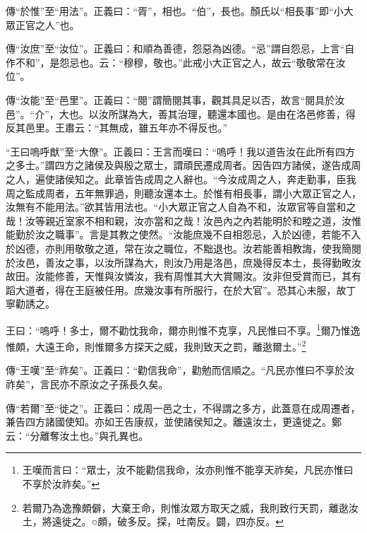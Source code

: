 {\noindent\zhuan{}\fzbyks 傳“於惟”至“用法”。正義曰：“胥”，相也。“伯”，長也。顏氏以“相長事”即“小大眾正官之人”也。 \par}

{\noindent\zhuan{}\fzbyks 傳“汝庶”至“汝位”。正義曰：和順為善德，怨惡為凶德。“忌”謂自怨忌，上言“自作不和”，是怨忌也。云：“穆穆，敬也。”此戒小大正官之人，故云“敬敬常在汝位”。 \par}

{\noindent\zhuan{}\fzbyks 傳“汝能”至“邑里”。正義曰：“閱”謂簡閱其事，觀其具足以否，故言“閱具於汝邑”。“介”，大也。以汝所謀為大，善其治理，聽還本國也。是由在洛邑修善，得反其邑里。王肅云：“其無成，雖五年亦不得反也。” \par}

{\noindent\shu{}\fzkt “王曰嗚呼猷”至“大僚”。正義曰：王言而嘆曰：“嗚呼！我以道告汝在此所有四方之多士。”謂四方之諸侯及與殷之眾士，謂頑民遷成周者。因告四方諸侯，遂告成周之人，遍使諸侯知之。此章皆告成周之人辭也。“今汝成周之人，奔走勤事，臣我周之監成周者，五年無罪過，則聽汝還本土。於惟有相長事，謂小大眾正官之人，汝無有不能用法。”欲其皆用法也。“小大眾正官之人自為不和，汝眾官等自當和之哉！汝等親近室家不相和親，汝亦當和之哉！汝邑內之內若能明於和睦之道，汝惟能勤於汝之職事”。言是其教之使然。“汝能庶幾不自相怨忌，入於凶德，若能不入於凶德，亦則用敬敬之道，常在汝之職位，不黜退也。汝若能善相教誨，使我簡閱於汝邑，善汝之事，以汝所謀為大，則汝乃用是洛邑，庶幾得反本土，長得勤畋汝故田。汝能修善，天惟與汝憐汝，我有周惟其大大賞賜汝。汝非但受賞而已，其有蹈大道者，得在王庭被任用。庶幾汝事有所服行，在於大官”。恐其心未服，故丁寧勸誘之。 \par}

王曰：“嗚呼！多士，爾不勸忱我命，爾亦則惟不克享，凡民惟曰不享。\footnote{王嘆而言曰：“眾士，汝不能勸信我命，汝亦則惟不能享天祚矣，凡民亦惟曰不享於汝祚矣。”}爾乃惟逸惟頗，大遠王命，則惟爾多方探天之威，我則致天之罰，離逖爾土。”\footnote{若爾乃為逸豫頗僻，大棄王命，則惟汝眾方取天之威，我則致行天罰，離逖汝土，將遠徙之。○頗，破多反。探，吐南反。闢，四亦反。}


{\noindent\zhuan{}\fzbyks 傳“王嘆”至“祚矣”。正義曰：“勸信我命”，勸勉而信順之。“凡民亦惟曰不享於汝祚矣”，言民亦不原汝之子孫長久矣。 \par}

{\noindent\zhuan{}\fzbyks 傳“若爾”至“徙之”。正義曰：成周一邑之士，不得謂之多方，此蓋意在成周遷者，兼告四方諸國使知。亦如王告康叔，並使諸侯知之。離遠汝土，更遠徙之。鄭云：“分離奪汝土也。”與孔異也。 \par}

